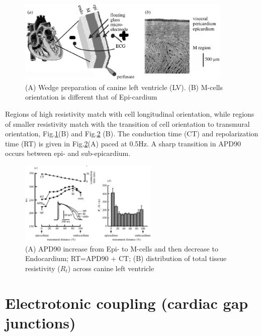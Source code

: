 \begin{figure}[hbt]
  \centerline{\includegraphics[height=4cm,
    angle=0]{./images/wedge_preparation.eps}}    
\caption{(A) Wedge preparation of canine left ventricle (LV). (B) M-cells
orientation is different that of Epi-cardium}
\label{fig:wedge_preparation}
\end{figure}

Regions of high resistivity match with cell longitudinal orientation, while
regions of smaller resistivity match with the transition of cell orientation to
transmural orientation, Fig.\ref{fig:wedge_preparation}(B) and
Fig.\ref{fig:wedge_APD_resistance} (B). The conduction time (CT) and
repolarization time (RT) is given in Fig.\ref{fig:wedge_APD_resistance}(A) paced
at 0.5Hz. A sharp transition in APD90 occurs between epi- and sub-epicardium.

\begin{figure}[hbt]
  \centerline{\includegraphics[height=4cm,
    angle=0]{./images/transmural_APD_resistance.eps}}    
\caption{(A) APD90 increase from Epi- to M-cells and then decrease to
Endocardium; RT=APD90 + CT; (B) distribution of total tissue resistivity
($R_t$) across canine left ventricle}
\label{fig:wedge_APD_resistance}
\end{figure}






\section{Electrotonic coupling (cardiac gap junctions)}

